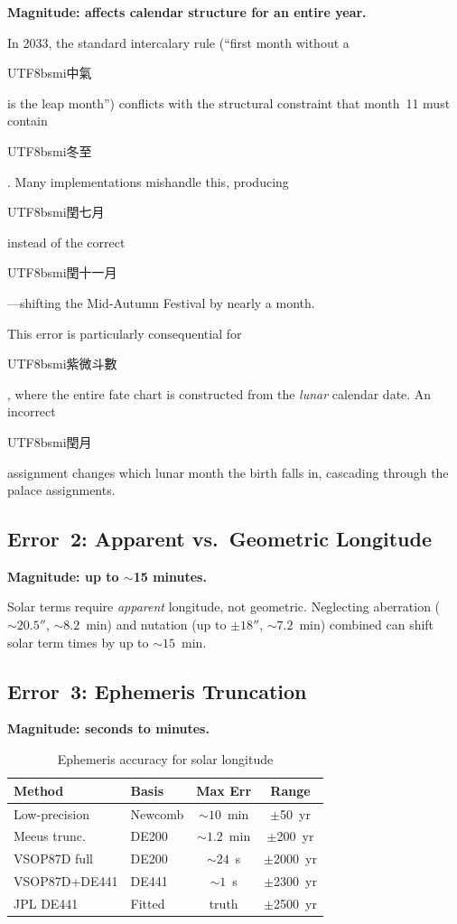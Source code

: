\documentclass[10pt,a4paper]{article}
\newcommand{\zh}[1]{\begin{CJK}{UTF8}{bsmi}#1\end{CJK}}
\begin{document}
\textbf{Magnitude: affects calendar structure for an entire year.}

In 2033, the standard intercalary rule (``first month without a \zh{中氣}
is the leap month'') conflicts with the structural constraint that month~11
must contain \zh{冬至} \cite{aslaksen2010, wikipedia_2033}. Many
implementations mishandle this, producing \zh{閏七月} instead of the
correct \zh{閏十一月} \cite{aslaksen_fake}---shifting the Mid-Autumn
Festival by nearly a month.

This error is particularly consequential for \zh{紫微斗數}, where the
entire fate chart is constructed from the \emph{lunar} calendar date.
An incorrect \zh{閏月} assignment changes which lunar month the birth
falls in, cascading through the palace assignments.

\subsection{Error~2: Apparent vs.\ Geometric Longitude}

\textbf{Magnitude: up to $\sim$15 minutes.}

Solar terms require \emph{apparent} longitude, not geometric. Neglecting
aberration ($\sim 20.5''$, $\sim 8.2$~min) and nutation (up to $\pm 18''$,
$\sim 7.2$~min) combined can shift solar term times by up to $\sim 15$~min.

\subsection{Error~3: Ephemeris Truncation}
\label{subsec:error_truncation}

\textbf{Magnitude: seconds to minutes.}

\begin{table}[H]
\centering
\caption{Ephemeris accuracy for solar longitude}
\label{tab:ephemeris}
\footnotesize
\begin{tabular}{llcc}
\toprule
\textbf{Method} & \textbf{Basis} & \textbf{Max Err} & \textbf{Range} \\
\midrule
Low-precision & Newcomb & $\sim 10$~min & $\pm$50~yr \\
Meeus trunc. & DE200 & $\sim 1.2$~min & $\pm$200~yr \\
VSOP87D full & DE200 & $\sim 24$~s & $\pm$2000~yr \\
VSOP87D+DE441 & DE441 & $\sim 1$~s & $\pm$2300~yr \\
JPL DE441 & Fitted & truth & $\pm$2500~yr \\
\bottomrule
\end{tabular}
\end{table}
\end{document}

